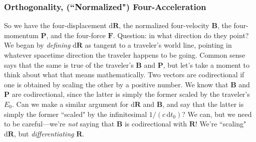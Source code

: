 \documentclass[12pt]{article}
\renewcommand{\vv}[1]{\mathbf{#1}}
\newcommand{\dd}[1]{\mathrm{d}#1}
\begin{document}
\subsubsection[Orthogonality, ("Normalized") Four-Acceleration]{Orthogonality, (``Normalized") Four-Acceleration}

So we have the four-displacement $\dd \vv R$, the normalized four-velocity $\vv B$, the four-momentum $\vv P$, and the four-force $\vv F$. Question: in what direction do they point? We began by \emph{defining} $\dd \vv R$ as tangent to a traveler's world line, pointing in whatever spacetime direction the traveler happens to be going. Common sense says that the same is true of the traveler's $\vv B$ and $\vv P$, but let's take a moment to think about what that means mathematically. Two vectors are codirectional if one is obtained by scaling the other by a positive number. We know that $\vv B$ and $\vv P$ are codirectional, since the latter is simply the former scaled by the traveler's $E_0$. Can we make a similar argument for $\dd \vv R$ and $\vv B$, and say that the latter is simply the former ``scaled" by the infinitesimal $1/(c \, \dd t_0)$? We can, but we need to be careful---we're \emph{not} saying that $\vv B$ is codirectional with $\vv R$! We're ``scaling" $\dd \vv R$, but \emph{differentiating} $\vv R$.
\end{document}
